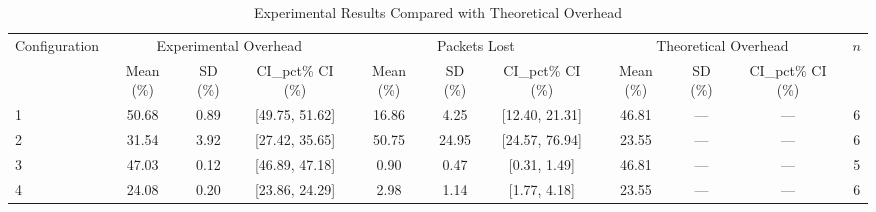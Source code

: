 
\begin{table}[htbp]
\centering
\caption{Experimental Results Compared with Theoretical Overhead}
\label{tab:results}
\begin{tabular}{lcccccccccc}
\hline
Configuration & \multicolumn{3}{c}{Experimental Overhead} & \multicolumn{3}{c}{Packets Lost} & \multicolumn{3}{c}{Theoretical Overhead} & $n$ \\
 & Mean (\%) & SD (\%) & {CI_pct}\% CI (\%) & Mean (\%) & SD (\%) & {CI_pct}\% CI (\%) & Mean (\%) & SD (\%) & {CI_pct}\% CI (\%) & \\
\hline
1 & 50.68 & 0.89 & [49.75, 51.62] & 16.86 & 4.25 & [12.40, 21.31] & 46.81 & --- & --- & 6 \\
2 & 31.54 & 3.92 & [27.42, 35.65] & 50.75 & 24.95 & [24.57, 76.94] & 23.55 & --- & --- & 6 \\
3 & 47.03 & 0.12 & [46.89, 47.18] & 0.90 & 0.47 & [0.31, 1.49] & 46.81 & --- & --- & 5 \\
4 & 24.08 & 0.20 & [23.86, 24.29] & 2.98 & 1.14 & [1.77, 4.18] & 23.55 & --- & --- & 6 \\
\hline
\end{tabular}
\end{table}

